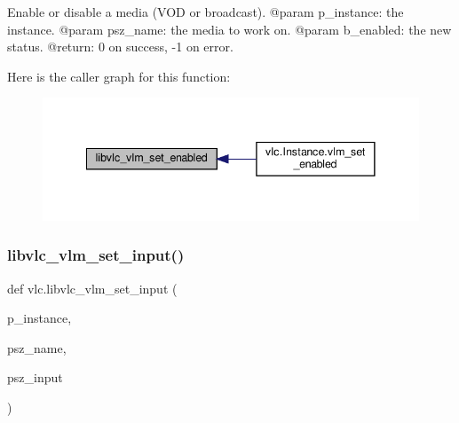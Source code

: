 \begin{DoxyVerb}Enable or disable a media (VOD or broadcast).
@param p_instance: the instance.
@param psz_name: the media to work on.
@param b_enabled: the new status.
@return: 0 on success, -1 on error.
\end{DoxyVerb}
 Here is the caller graph for this function\+:
\nopagebreak
\begin{figure}[H]
\begin{center}
\leavevmode
\includegraphics[width=341pt]{namespacevlc_affb9bce216fa7e0b538a0d907e657c2c_icgraph}
\end{center}
\end{figure}
\mbox{\label{namespacevlc_a21fb77c5d5ad58c7f98cebf8ee173ad9}} 
\subsubsection{\texorpdfstring{libvlc\+\_\+vlm\+\_\+set\+\_\+input()}{libvlc\_vlm\_set\_input()}}
{\footnotesize\ttfamily def vlc.\+libvlc\+\_\+vlm\+\_\+set\+\_\+input (\begin{DoxyParamCaption}\item[{}]{p\+\_\+instance,  }\item[{}]{psz\+\_\+name,  }\item[{}]{psz\+\_\+input }\end{DoxyParamCaption})}

